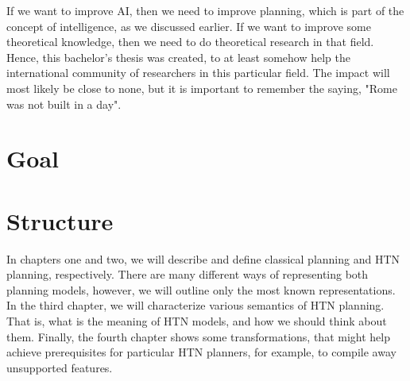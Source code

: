 \medskip\noindent
If we want to improve AI, then we need to improve planning, which is part of the concept of intelligence, as we discussed earlier. If we want to improve some theoretical knowledge, then we need to do theoretical research in that field. Hence, this bachelor's thesis was created, to at least somehow help the international community of researchers in this particular field. The impact will most likely be close to none, but it is important to remember the saying, "Rome was not built in a day".

\section*{Goal}

\noindent
{}

\section*{Structure}

\noindent
In chapters one and two, we will describe and define classical planning and HTN planning, respectively. There are many different ways of representing both planning models, however, we will outline only the most known representations. In the third chapter, we will characterize various semantics of HTN planning. That is, what is the meaning of HTN models, and how we should think about them. Finally, the fourth chapter shows some transformations, that might help achieve prerequisites for particular HTN planners, for example, to compile away unsupported features.
